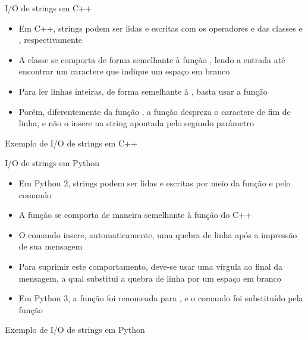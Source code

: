 \begin{frame}[fragile]{I/O de strings em C++}

    \begin{itemize}
        \item Em C++, strings podem ser lidas e escritas com os operadores  e
             das classes  e , respectivamente
        \pause

        \item A classe  se comporta de forma semelhante à função , 
            lendo a entrada até encontrar um caractere que indique um espaço em branco
        \pause

        \item Para ler linhas inteiras, de forma semelhante à , basta usar a 
            função 
        \pause

        \item Porém, diferentemente da função , a função  
            despreza o caractere de fim de linha, e não o insere na string apontada pelo segundo 
            parâmetro
    \end{itemize}

\end{frame}

\begin{frame}[fragile]{Exemplo de I/O de strings em C++}
\end{frame}

\begin{frame}[fragile]{I/O de strings em Python}

    \begin{itemize}
        \item Em Python 2, strings podem ser lidas e escritas por meio da função
             e pelo comando 
        \pause

        \item A função  se comporta de maneira semelhante à função
             do C++
        \pause

        \item O comando  insere, automaticamente, uma quebra de linha após
            a impressão de sua mensagem
        \pause

        \item Para suprimir este comportamento, deve-se usar uma vírgula ao final da mensagem,
            a qual substitui a quebra de linha por um espaço em branco
        \pause

        \item Em Python 3, a função  foi renomeada para ,
            e o comando  foi substituído pela função 
    \end{itemize} 

\end{frame}

\begin{frame}[fragile]{Exemplo de I/O de strings em Python}
\end{frame}
